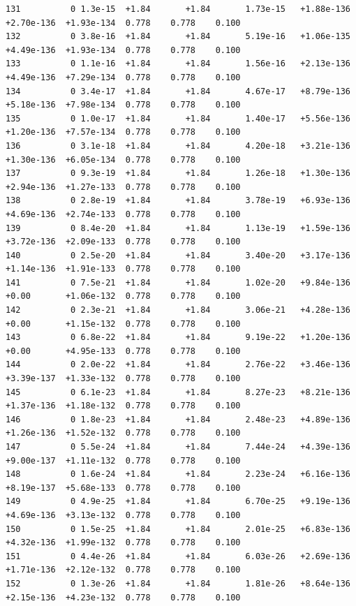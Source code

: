 \documentclass[12pt]{article}
\numberwithin{equation}{section}
\begin{document}
\begin{lstlisting}
131          0 1.3e-15  +1.84       +1.84       1.73e-15   +1.88e-136  +2.70e-136  +1.93e-134  0.778    0.778    0.100
132          0 3.8e-16  +1.84       +1.84       5.19e-16   +1.06e-135  +4.49e-136  +1.93e-134  0.778    0.778    0.100
133          0 1.1e-16  +1.84       +1.84       1.56e-16   +2.13e-136  +4.49e-136  +7.29e-134  0.778    0.778    0.100
134          0 3.4e-17  +1.84       +1.84       4.67e-17   +8.79e-136  +5.18e-136  +7.98e-134  0.778    0.778    0.100
135          0 1.0e-17  +1.84       +1.84       1.40e-17   +5.56e-136  +1.20e-136  +7.57e-134  0.778    0.778    0.100
136          0 3.1e-18  +1.84       +1.84       4.20e-18   +3.21e-136  +1.30e-136  +6.05e-134  0.778    0.778    0.100
137          0 9.3e-19  +1.84       +1.84       1.26e-18   +1.30e-136  +2.94e-136  +1.27e-133  0.778    0.778    0.100
138          0 2.8e-19  +1.84       +1.84       3.78e-19   +6.93e-136  +4.69e-136  +2.74e-133  0.778    0.778    0.100
139          0 8.4e-20  +1.84       +1.84       1.13e-19   +1.59e-136  +3.72e-136  +2.09e-133  0.778    0.778    0.100
140          0 2.5e-20  +1.84       +1.84       3.40e-20   +3.17e-136  +1.14e-136  +1.91e-133  0.778    0.778    0.100
141          0 7.5e-21  +1.84       +1.84       1.02e-20   +9.84e-136  +0.00       +1.06e-132  0.778    0.778    0.100
142          0 2.3e-21  +1.84       +1.84       3.06e-21   +4.28e-136  +0.00       +1.15e-132  0.778    0.778    0.100
143          0 6.8e-22  +1.84       +1.84       9.19e-22   +1.20e-136  +0.00       +4.95e-133  0.778    0.778    0.100
144          0 2.0e-22  +1.84       +1.84       2.76e-22   +3.46e-136  +3.39e-137  +1.33e-132  0.778    0.778    0.100
145          0 6.1e-23  +1.84       +1.84       8.27e-23   +8.21e-136  +1.37e-136  +1.18e-132  0.778    0.778    0.100
146          0 1.8e-23  +1.84       +1.84       2.48e-23   +4.89e-136  +1.26e-136  +1.52e-132  0.778    0.778    0.100
147          0 5.5e-24  +1.84       +1.84       7.44e-24   +4.39e-136  +9.00e-137  +1.11e-132  0.778    0.778    0.100
148          0 1.6e-24  +1.84       +1.84       2.23e-24   +6.16e-136  +8.19e-137  +5.68e-133  0.778    0.778    0.100
149          0 4.9e-25  +1.84       +1.84       6.70e-25   +9.19e-136  +4.69e-136  +3.13e-132  0.778    0.778    0.100
150          0 1.5e-25  +1.84       +1.84       2.01e-25   +6.83e-136  +4.32e-136  +1.99e-132  0.778    0.778    0.100
151          0 4.4e-26  +1.84       +1.84       6.03e-26   +2.69e-136  +1.71e-136  +2.12e-132  0.778    0.778    0.100
152          0 1.3e-26  +1.84       +1.84       1.81e-26   +8.64e-136  +2.15e-136  +4.23e-132  0.778    0.778    0.100

\end{lstlisting}
\end{document}

